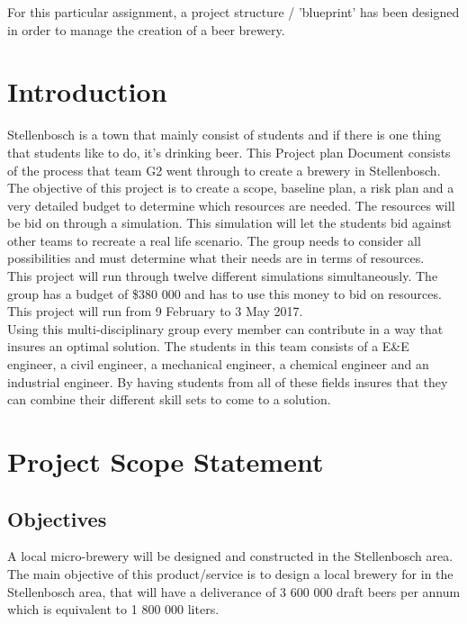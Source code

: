 \noindent
For this particular assignment, a project structure / 'blueprint' has been designed in order to manage the creation of a beer brewery.

\newpage
\tableofcontents
\listoffigures
\listoftables

\newpage
\section{Introduction}

Stellenbosch is a town that mainly consist of students and if there is one thing that students like to do, it’s drinking beer. This Project plan Document consists of the process that team G2 went through to create a brewery in Stellenbosch.\\

\noindent
The objective of this project is to create a scope, baseline plan, a risk plan and a very detailed budget to determine which resources are needed. The resources will be bid on through a simulation. This simulation will let the students bid against other teams to recreate a real life scenario. The group needs to consider all possibilities and must determine what their needs are in terms of resources.\\

\noindent
This project will run through twelve different simulations simultaneously. The group has a budget of \$380 000 and has to use this money to bid on resources. This project will run from 9 February to 3 May 2017.\\

\noindent
Using this multi-disciplinary group every member can contribute in a way that insures an optimal solution. The students in this team consists of a E\&E engineer, a civil engineer, a mechanical engineer, a chemical engineer and an industrial engineer. By having students from all of these fields insures that they can combine their different skill sets to come to a solution.

\section{Project Scope Statement}
\subsection{Objectives}

A local micro-brewery will be designed and constructed in the Stellenbosch area. The main objective of this product/service is to design a local brewery for in the Stellenbosch area, that will have a deliverance of 3 600 000 draft beers per annum which is equivalent to 1 800 000 liters.\\

